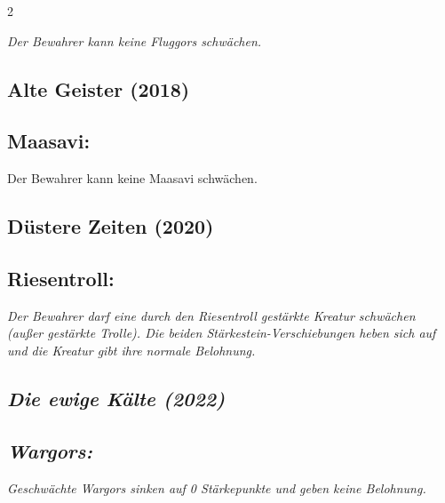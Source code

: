 \documentclass[10pt, a4paper, oneside]{book}
\newcommand{\fan}[1]{\textit{#1}}
\begin{document}
\begin{multicols*}{2}
\begin{bgcolor}[color-BB]
\fan{Der Bewahrer kann keine Fluggors schwächen.}

\end{bgcolor}



\begin{bgcolor}[color-AG]
\section{Alte Geister (2018)}

\subsection{Maasavi:}

Der Bewahrer kann keine Maasavi schwächen.
\supercite{AG:Begleitheft}

\end{bgcolor}



\begin{bgcolor}[color-DZ]
\section{Düstere Zeiten (2020)}


\subsection{Riesentroll:}

\fan{Der Bewahrer darf eine durch den Riesentroll gestärkte Kreatur schwächen (außer gestärkte Trolle). Die beiden Stärkestein-Verschiebungen heben sich auf und die Kreatur gibt ihre normale Belohnung.}

\end{bgcolor}








\begin{bgcolor}
\section{\fan{Die ewige Kälte (2022)}}


\subsection{\fan{Wargors:}}

\fan{Geschwächte Wargors sinken auf 0 Stärkepunkte und geben keine Belohnung. }



\end{bgcolor}
\end{multicols*}
\end{document}
